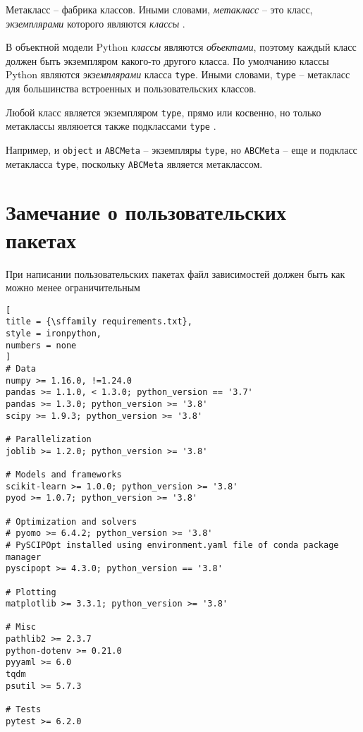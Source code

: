 \documentclass[%
	11pt,
	a4paper,
	utf8,
		]{article}
\begin{document}
Метакласс -- фабрика классов. Иными словами, \emph{метакласс} -- это класс, \emph{экземплярами} которого являются \emph{классы} \cite[]{ramalho:python-2022}.

В объектной модели Python \emph{классы} являются \emph{объектами}, поэтому каждый класс должен быть экземпляром какого-то другого класса. По умолчанию классы Python являются \emph{экземплярами} класса \verb*|type|. Иными словами, \verb|type| -- метакласс для большинства встроенных и пользовательских классов.

Любой класс является экземпляром \verb*|type|, прямо или косвенно, но только метаклассы являюется также подклассами \verb|type| \cite[]{ramalho:python-2022}.

Например, и \verb*|object| и \verb|ABCMeta| -- экземпляры \verb*|type|, но \verb|ABCMeta| -- еще и подкласс метакласса \verb*|type|, поскольку \verb|ABCMeta| является метаклассом.






\section{Замечание о пользовательских пакетах}

При написании пользовательских пакетах файл зависимостей должен быть как можно менее ограничительным
\begin{lstlisting}[
title = {\sffamily requirements.txt},
style = ironpython,
numbers = none
]
# Data
numpy >= 1.16.0, !=1.24.0
pandas >= 1.1.0, < 1.3.0; python_version == '3.7'
pandas >= 1.3.0; python_version >= '3.8'
scipy >= 1.9.3; python_version >= '3.8'

# Parallelization
joblib >= 1.2.0; python_version >= '3.8'

# Models and frameworks
scikit-learn >= 1.0.0; python_version >= '3.8'
pyod >= 1.0.7; python_version >= '3.8'

# Optimization and solvers
# pyomo >= 6.4.2; python_version >= '3.8'
# PySCIPOpt installed using environment.yaml file of conda package manager
pyscipopt >= 4.3.0; python_version == '3.8'

# Plotting
matplotlib >= 3.3.1; python_version >= '3.8'

# Misc
pathlib2 >= 2.3.7
python-dotenv >= 0.21.0
pyyaml >= 6.0
tqdm
psutil >= 5.7.3

# Tests
pytest >= 6.2.0
\end{lstlisting}
\end{document}
